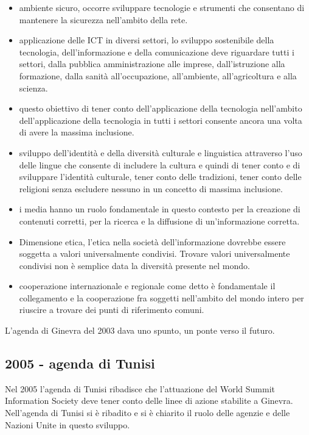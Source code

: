\begin{itemize}
    \item ambiente sicuro, occorre sviluppare tecnologie e strumenti che consentano di mantenere la sicurezza nell'ambito della rete.
    
    \item applicazione delle ICT in diversi settori, lo sviluppo sostenibile della tecnologia, dell'informazione e della comunicazione deve riguardare tutti i settori, dalla pubblica amministrazione alle imprese, dall'istruzione alla formazione, dalla sanità all'occupazione, all'ambiente, all'agricoltura e alla scienza.
    
    \item questo obiettivo di tener conto dell'applicazione della tecnologia nell'ambito dell'applicazione della tecnologia in tutti i settori consente ancora una volta di avere la massima inclusione.
    
    \item sviluppo dell'identità e della diversità culturale e linguistica attraverso l'uso delle lingue che consente di includere la cultura e quindi di tener conto e di sviluppare l'identità culturale, tener conto delle tradizioni, tener conto delle religioni senza escludere nessuno in un concetto di massima inclusione.
    
    \item i media hanno un ruolo fondamentale in questo contesto per la creazione di contenuti corretti, per la ricerca e la diffusione di un'informazione corretta.
    
    \item Dimensione etica, l'etica nella società dell'informazione dovrebbe essere soggetta a valori universalmente condivisi. Trovare valori universalmente condivisi non è semplice data la diversità presente nel mondo.
    
    \item cooperazione internazionale e regionale come detto è fondamentale il collegamento e la cooperazione fra soggetti nell'ambito del mondo intero per riuscire a trovare dei punti di riferimento comuni.
\end{itemize}

L'agenda di Ginevra del 2003 dava uno spunto, un ponte verso il futuro.

\subsection{2005 - agenda di Tunisi}

Nel 2005 l'agenda di Tunisi ribadisce che l'attuazione del World Summit Information Society deve tener conto delle linee di azione stabilite a Ginevra. Nell'agenda di Tunisi si è ribadito e si è chiarito il ruolo delle agenzie e delle Nazioni Unite in questo sviluppo. 

